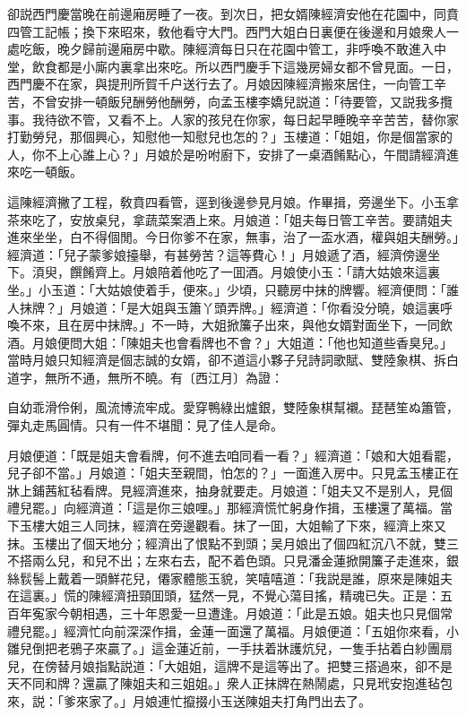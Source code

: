 卻説西門慶當晚在前邊廂房睡了一夜。到次日，把女婿陳經濟安他在花園中，同賁四管工記帳；換下來昭來，敎他看守大門。西門大姐白日裏便在後邊和月娘衆人一處吃飯，晚夕歸前邊廂房中歇。陳經濟每日只在花園中管工，非呼喚不敢進入中堂，飲食都是小廝内裏拿出來吃。所以西門慶手下這幾房婦女都不曾見面。一日，西門慶不在家，與提刑所賀千户送行去了。月娘因陳經濟搬來居住，一向管工辛苦，不曾安排一頓飯兒酬勞他酬勞，向孟玉樓李嬌兒説道：「待要管，又説我多攬事。我待欲不管，又看不上。人家的孩兒在你家，每日起早睡晚辛辛苦苦，替你家打勤勞兒，那個興心，知慰他一知慰兒也怎的？」玉樓道：「姐姐，你是個當家的人，你不上心誰上心？」月娘於是吩咐廚下，安排了一桌酒餚點心，午間請經濟進來吃一頓飯。

這陳經濟撇了工程，敎賁四看管，逕到後邊參見月娘。作畢揖，旁邊坐下。小玉拿茶來吃了，安放桌兒，拿蔬菜案酒上來。月娘道：「姐夫每日管工辛苦。要請姐夫進來坐坐，白不得個閒。今日你爹不在家，無事，治了一盃水酒，權與姐夫酬勞。」經濟道：「兒子蒙爹娘擡舉，有甚勞苦？這等費心！」月娘遞了酒，經濟傍邊坐下。湏臾，饌餚齊上。月娘陪着他吃了一囬酒。月娘使小玉：「請大姑娘來這裏坐。」小玉道：「大姑娘使着手，便來。」少頃，只聽房中抹的牌響。經濟便問：「誰人抹牌？」月娘道：「是大姐與玉簫丫頭弄牌。」經濟道：「你看没分曉，娘這裏呼喚不來，且在房中抹牌。」不一時，大姐掀簾子出來，與他女婿對面坐下，一同飲酒。月娘便問大姐：「陳姐夫也會看牌也不會？」大姐道：「他也知道些香臭兒。」當時月娘只知經濟是個志誠的女婿，卻不道這小夥子兒詩詞歌賦、雙陸象棋、拆白道字，無所不通，無所不曉。有〔西江月〕為證：

\begin{myquote}
自幼乖滑伶俐，風流博流牢成。愛穿鴨綠出爐銀，雙陸象棋幫襯。琵琶笙ぬ簫管，彈丸走馬圓情。只有一件不堪聞：見了佳人是命。
\end{myquote}

月娘便道：「既是姐夫會看牌，何不進去咱同看一看？」經濟道：「娘和大姐看罷，兒子卻不當。」月娘道：「姐夫至親間，怕怎的？」一面進入房中。只見孟玉樓正在牀上鋪茜紅毡看牌。見經濟進來，抽身就要走。月娘道：「姐夫又不是别人，見個禮兒罷。」向經濟道：「這是你三娘哩。」那經濟慌忙躬身作揖，玉樓還了萬福。當下玉樓大姐三人同抹，經濟在旁邊觀看。抹了一囬，大姐輸了下來，經濟上來又抹。玉樓出了個天地分；經濟出了恨點不到頭；吴月娘出了個四紅沉八不就，雙三不搭兩么兒，和兒不出；左來右去，配不着色頭。只見潘金蓮掀開簾子走進來，銀絲䯼髻上戴着一頭鮮花兒，僊家體態玉貌，笑嘻嘻道：「我説是誰，原來是陳姐夫在這裏。」慌的陳經濟扭頸囬頭，猛然一見，不覺心蕩目搖，精魂已失。正是：五百年寃家今朝相遇，三十年恩愛一旦遭逢。月娘道：「此是五娘。姐夫也只見個常禮兒罷。」經濟忙向前深深作揖，金蓮一面還了萬福。月娘便道：「五姐你來看，小雛兒倒把老鴉子來贏了。」這金蓮近前，一手扶着牀護炕兒，一隻手拈着白紗團扇兒，在傍替月娘指點説道：「大姐姐，這牌不是這等出了。把雙三搭過來，卻不是天不同和牌？還贏了陳姐夫和三姐姐。」衆人正抹牌在熱鬧處，只見玳安抱進毡包來，説：「爹來家了。」月娘連忙攛掇小玉送陳姐夫打角門出去了。

